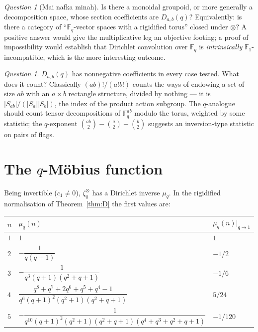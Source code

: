 \documentclass[11pt,a4paper]{article}
\theoremstyle{definition}
\theoremstyle{remark}
\newtheorem{question}[theorem]{Question}
\newcommand{\FF}{\mathbb{F}}
\newcommand{\norm}[1]{\lvert #1 \rvert}
\begin{document}
\begin{question}[Mai nafka minah]
Is there a monoidal groupoid, or more generally a decomposition space, whose section
coefficients are $D_{a,b}(q)$? Equivalently: is there a category of ``$\FF_q$-vector
spaces with a rigidified torus'' closed under $\otimes$? A positive answer would give the
multiplicative leg an objective footing; a proof of impossibility would establish that
Dirichlet convolution over $\FF_q$ is \emph{intrinsically} $\FF_1$-incompatible, which is
the more interesting outcome.
\end{question}

\begin{question}\label{q:interp}
$D_{a,b}(q)$ has nonnegative coefficients in every case tested. What does it count?
Classically $(ab)!/(a!b!)$ counts the ways of endowing a set of size $ab$ with an
$a \times b$ rectangle structure, divided by nothing --- it is
$\norm{S_{ab}}/(\norm{S_a}\norm{S_b})$, the index of the product action subgroup. The
$q$-analogue should count tensor decompositions of $\FF_q^{ab}$ modulo the torus, weighted
by some statistic; the $q$-exponent $\binom{ab}2 - \binom a2 - \binom b2$ suggests an
inversion-type statistic on pairs of flags.
\end{question}

\section{The \texorpdfstring{$q$}{q}-M\"obius function}

Being invertible ($c_1 \neq 0$), $\zeta_q^{\otimes}$ has a Dirichlet inverse
$\mu_q$. In the rigidified normalisation of Theorem~\ref{thm:D} the first values are:

\begin{center}
\small
\begin{tabular}{@{}lll@{}}
\toprule
$n$ & $\mu_q(n)$ & $\mu_q(n)\big|_{q\to1}$ \\
\midrule
$1$ & $1$ & $1$ \\
$2$ & $-\dfrac{1}{q(q+1)}$ & $-1/2$ \\[0.5em]
$3$ & $-\dfrac{1}{q^3(q+1)(q^2+q+1)}$ & $-1/6$ \\[0.5em]
$4$ & $\dfrac{q^8+q^7+2q^6+q^5+q^4-1}{q^6(q+1)^2(q^2+1)(q^2+q+1)}$ & $5/24$ \\[0.5em]
$5$ & $-\dfrac{1}{q^{10}(q+1)^2(q^2+1)(q^2+q+1)(q^4+q^3+q^2+q+1)}$ & $-1/120$ \\
\bottomrule
\end{tabular}
\end{center}
\end{document}
